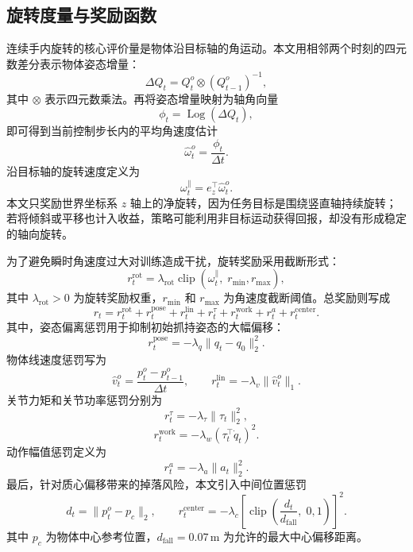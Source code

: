 \subsection{旋转度量与奖励函数}
\thesisbodyfont
连续手内旋转的核心评价量是物体沿目标轴的角运动。本文用相邻两个时刻的四元数差分表示物体姿态增量：
\begin{equation}
\Delta Q_t =
Q_t^o \otimes (Q_{t-1}^o)^{-1},
\end{equation}
其中 \(\otimes\) 表示四元数乘法。再将姿态增量映射为轴角向量
\begin{equation}
\phi_t = \operatorname{Log}(\Delta Q_t),
\end{equation}
即可得到当前控制步长内的平均角速度估计
\begin{equation}
\hat{\omega}_t^o = \frac{\phi_t}{\Delta t}.
\end{equation}
沿目标轴的旋转速度定义为
\begin{equation}
\omega_t^{\parallel} = e_z^\top \hat{\omega}_t^o .
\end{equation}
本文只奖励世界坐标系 \(z\) 轴上的净旋转，因为任务目标是围绕竖直轴持续旋转；若将倾斜或平移也计入收益，策略可能利用非目标运动获得回报，却没有形成稳定的轴向旋转。

为了避免瞬时角速度过大对训练造成干扰，旋转奖励采用截断形式：
\begin{equation}
r_t^{\mathrm{rot}}
=
\lambda_{\mathrm{rot}}
\operatorname{clip}\!\left(
\omega_t^{\parallel},\;
r_{\min}, r_{\max}
\right),
\end{equation}
其中 \(\lambda_{\mathrm{rot}}>0\) 为旋转奖励权重，\(r_{\min}\) 和 \(r_{\max}\) 为角速度截断阈值。总奖励则写成
\begin{equation}
r_t
=
r_t^{\mathrm{rot}}
+ r_t^{\mathrm{pose}}
+ r_t^{\mathrm{lin}}
+ r_t^{\tau}
+ r_t^{\mathrm{work}}
+ r_t^{a}
+ r_t^{\mathrm{center}}.
\end{equation}
其中，姿态偏离惩罚用于抑制初始抓持姿态的大幅偏移：
\begin{equation}
r_t^{\mathrm{pose}}
=
-\lambda_q \|q_t-q_0\|_2^2.
\end{equation}
物体线速度惩罚写为
\begin{equation}
\hat v_t^o = \frac{p_t^o-p_{t-1}^o}{\Delta t},
\qquad
r_t^{\mathrm{lin}}
=
-\lambda_v \|\hat v_t^o\|_1.
\end{equation}
关节力矩和关节功率惩罚分别为
\begin{equation}
r_t^{\tau}
=
-\lambda_{\tau}\|\tau_t\|_2^2,
\end{equation}
\begin{equation}
r_t^{\mathrm{work}}
=
-\lambda_w(\tau_t^\top \dot q_t)^2.
\end{equation}
动作幅值惩罚定义为
\begin{equation}
r_t^{a}
=
-\lambda_a\|a_t\|_2^2.
\end{equation}
最后，针对质心偏移带来的掉落风险，本文引入中间位置惩罚
\begin{equation}
d_t = \|p_t^o-p_c\|_2,
\qquad
r_t^{\mathrm{center}}
=
-\lambda_c
\left[
\operatorname{clip}\!\left(
\frac{d_t}{d_{\mathrm{fall}}},\;
0,1
\right)
\right]^2.
\end{equation}
其中 \(p_c\) 为物体中心参考位置，\(d_{\mathrm{fall}}=0.07\,\mathrm{m}\) 为允许的最大中心偏移距离。

